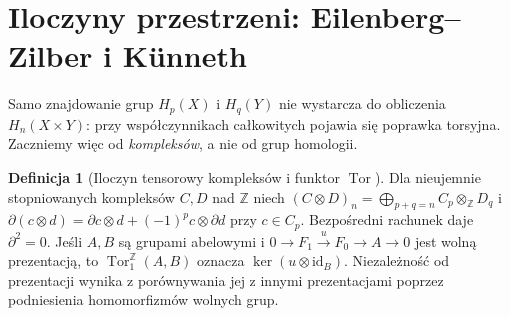 \documentclass[11pt,a4paper,oneside]{report}
\newcommand{\Z}{\mathbb{Z}}
\newcommand{\id}{\mathrm{id}}
\theoremstyle{plain}
\theoremstyle{definition}
\newtheorem{definicja}[twierdzenie]{Definicja}
\theoremstyle{remark}
\begin{document}
\section{Iloczyny przestrzeni: Eilenberg--Zilber i Künneth}
\label{sec:ez-kunneth-v4}

Samo znajdowanie grup $H_p(X)$ i $H_q(Y)$ nie wystarcza do
obliczenia $H_n(X\times Y)$: przy współczynnikach całkowitych
pojawia się poprawka torsyjna. Zaczniemy więc od \emph{kompleksów},
a nie od grup homologii.

\begin{definicja}[Iloczyn tensorowy kompleksów i funktor $\operatorname{Tor}$]
Dla nieujemnie stopniowanych kompleksów $C,D$ nad $\Z$ niech
$(C\otimes D)_n=\bigoplus_{p+q=n}C_p\otimes_\Z D_q$ i
$\partial(c\otimes d)=\partial c\otimes d+(-1)^p c\otimes\partial d$
przy $c\in C_p$. Bezpośredni rachunek daje $\partial^2=0$.
Jeśli $A,B$ są grupami abelowymi i
$0\to F_1\xrightarrow{u}F_0\to A\to0$ jest wolną prezentacją,
to $\operatorname{Tor}^{\Z}_1(A,B)$ oznacza
$\ker(u\otimes\id_B)$. Niezależność od prezentacji wynika
z porównywania jej z innymi prezentacjami poprzez podniesienia
homomorfizmów wolnych grup.
\end{definicja}
\end{document}
